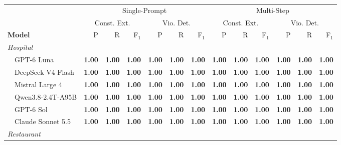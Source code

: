 \begin{table}[t]
  \centering
  \small
  \setlength{\tabcolsep}{3.5pt}
  \begin{tabular}{l@{\hspace{0.6em}}rrr@{\hspace{0.6em}}rrr@{\hspace{0.6em}}rrr@{\hspace{0.6em}}rrr}
  \toprule
  & \multicolumn{6}{c}{Single-Prompt} & \multicolumn{6}{c}{Multi-Step} \\
  \cmidrule(lr){2-7} \cmidrule(lr){8-13}
  & \multicolumn{3}{c}{Const. Ext.} & \multicolumn{3}{c}{Vio. Det.} & \multicolumn{3}{c}{Const. Ext.} & \multicolumn{3}{c}{Vio. Det.} \\
  \cmidrule(lr){2-4} \cmidrule(lr){5-7} \cmidrule(lr){8-10} \cmidrule(lr){11-13}
  \textbf{Model} & P & R & F$_1$ & P & R & F$_1$ & P & R & F$_1$ & P & R & F$_1$ \\
  \midrule
  \multicolumn{13}{l}{\textit{Hospital}} \\
  ~~GPT-6 Luna & \textbf{1.00} & \textbf{1.00} & \textbf{1.00} & \textbf{1.00} & \textbf{1.00} & \textbf{1.00} & \textbf{1.00} & \textbf{1.00} & \textbf{1.00} & \textbf{1.00} & \textbf{1.00} & \textbf{1.00} \\
  ~~DeepSeek-V4-Flash & \textbf{1.00} & \textbf{1.00} & \textbf{1.00} & \textbf{1.00} & \textbf{1.00} & \textbf{1.00} & \textbf{1.00} & \textbf{1.00} & \textbf{1.00} & \textbf{1.00} & \textbf{1.00} & \textbf{1.00} \\
  ~~Mistral Large 4 & \textbf{1.00} & \textbf{1.00} & \textbf{1.00} & \textbf{1.00} & \textbf{1.00} & \textbf{1.00} & \textbf{1.00} & \textbf{1.00} & \textbf{1.00} & \textbf{1.00} & \textbf{1.00} & \textbf{1.00} \\
  ~~Qwen3.8-2.4T-A95B & \textbf{1.00} & \textbf{1.00} & \textbf{1.00} & \textbf{1.00} & \textbf{1.00} & \textbf{1.00} & \textbf{1.00} & \textbf{1.00} & \textbf{1.00} & \textbf{1.00} & \textbf{1.00} & \textbf{1.00} \\
  ~~GPT-6 Sol & \textbf{1.00} & \textbf{1.00} & \textbf{1.00} & \textbf{1.00} & \textbf{1.00} & \textbf{1.00} & \textbf{1.00} & \textbf{1.00} & \textbf{1.00} & \textbf{1.00} & \textbf{1.00} & \textbf{1.00} \\
  ~~Claude Sonnet 5.5 & \textbf{1.00} & \textbf{1.00} & \textbf{1.00} & \textbf{1.00} & \textbf{1.00} & \textbf{1.00} & \textbf{1.00} & \textbf{1.00} & \textbf{1.00} & \textbf{1.00} & \textbf{1.00} & \textbf{1.00} \\
  \midrule
  \multicolumn{13}{l}{\textit{Restaurant}} \\

\end{tabular}
\end{table}
